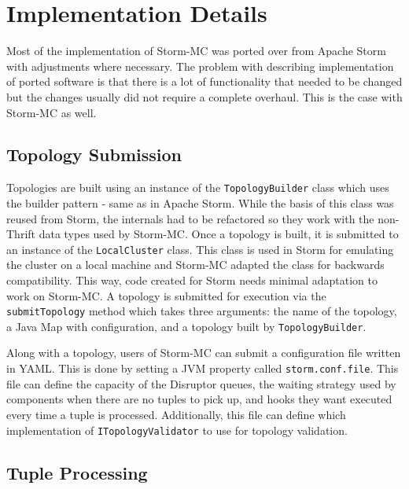 \documentclass[bsc,twoside,singlespacing,normalheadings,parskip]{infthesis}\usepackage[]{graphicx}\usepackage[]{color}
\begin{document}
\section{Implementation Details}
\label{sec:implementation}

Most of the implementation of Storm-MC was ported over from Apache Storm with adjustments where necessary. The problem with describing implementation of ported software is that there is a lot of functionality that needed to be changed but the changes usually did not require a complete overhaul. This is the case with Storm-MC as well.

\subsection{Topology Submission}

Topologies are built using an instance of the \texttt{TopologyBuilder} class which uses the builder pattern - same as in Apache Storm. While the basis  of this class was reused from Storm, the internals had to be refactored so they work with the non-Thrift data types used by Storm-MC. Once a topology is built, it is submitted to an instance of the \texttt{LocalCluster} class. This class is used in Storm for emulating the cluster on a local machine and Storm-MC adapted the class for backwards compatibility. This way, code created for Storm needs minimal adaptation to work on Storm-MC. A topology is submitted for execution via the \texttt{submitTopology} method which takes three arguments: the name of the topology, a Java Map with configuration, and a topology built by \texttt{TopologyBuilder}.

Along with a topology, users of Storm-MC can submit a configuration file written in YAML. This is done by setting a JVM property called \texttt{storm.conf.file}. This file can define the capacity of the Disruptor queues, the waiting strategy used by components when there are no tuples to pick up, and hooks they want executed every time a tuple is processed. Additionally, this file can define which implementation of \texttt{ITopologyValidator} to use for topology validation.

\subsection{Tuple Processing}
\end{document}

